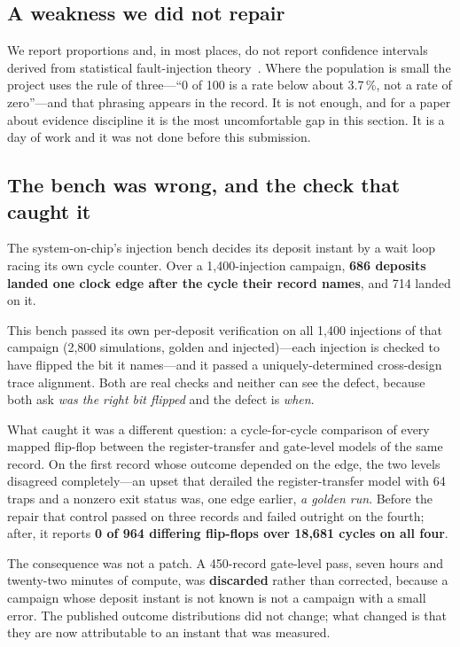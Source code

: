 \documentclass[11pt,a4paper]{article}
\begin{document}
\subsection{A weakness we did not repair}

We report proportions and, in most places, do not report confidence
intervals derived from statistical fault-injection
theory~\cite{leveugle2009}. Where the population is small the project
uses the rule of three---``0 of 100 is a rate below about 3.7\,\%, not a
rate of zero''---and that phrasing appears in the record. It is not
enough, and for a paper about evidence discipline it is the most
uncomfortable gap in this section. It is a day of work and it was not
done before this submission.

\subsection{The bench was wrong, and the check that caught it}

The system-on-chip's injection bench decides its deposit instant by a
wait loop racing its own cycle counter. Over a 1{,}400-injection
campaign, \textbf{686 deposits landed one clock edge after the cycle
their record names}, and 714 landed on it.

This bench passed its own per-deposit verification on all
1{,}400 injections of that campaign (2{,}800 simulations, golden and
injected)---each injection is checked to have flipped the bit it
names---and it passed a uniquely-determined cross-design trace alignment.
Both are real checks and neither can see the defect, because both ask
\emph{was the right bit flipped} and the defect is \emph{when}.

What caught it was a different question: a cycle-for-cycle comparison of
every mapped flip-flop between the register-transfer and gate-level
models of the same record. On the first record whose outcome depended on
the edge, the two levels disagreed completely---an upset that derailed
the register-transfer model with 64 traps and a nonzero exit status was,
one edge earlier, \emph{a golden run}. Before the repair that control
passed on three records and failed outright on the fourth; after, it
reports \textbf{0 of 964 differing flip-flops over 18{,}681 cycles on all
four}.

The consequence was not a patch. A 450-record gate-level pass, seven
hours and twenty-two minutes of compute, was \textbf{discarded} rather
than corrected, because a campaign whose deposit instant is not known is
not a campaign with a small error. The published outcome distributions
did not change; what changed is that they are now attributable to an
instant that was measured.
\end{document}
